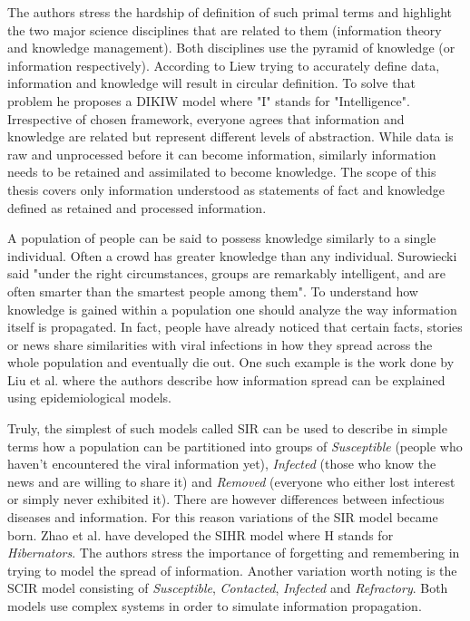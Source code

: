The authors stress the hardship of definition of such primal terms and highlight the two major science disciplines that are related to them (information theory and knowledge management).
Both disciplines use the pyramid of knowledge (or information respectively).
According to Liew\cite{liew2013dikiw} trying to accurately define data, information and knowledge will result in circular definition.
To solve that problem he proposes a DIKIW model where "I" stands for "Intelligence".
Irrespective of chosen framework, everyone agrees that information and knowledge are related but represent different levels of abstraction.
While data is raw and unprocessed before it can become information, similarly information needs to be retained and assimilated to become knowledge.
The scope of this thesis covers only information understood as statements of fact and knowledge defined as retained and processed information.

A population of people can be said to possess knowledge similarly to a single individual.
Often a crowd has greater knowledge than any individual.
Surowiecki said "under the right circumstances, groups are remarkably intelligent, and are often smarter than the smartest people among them"\cite{surowiecki2005wisdom}.
To understand how knowledge is gained within a population one should analyze the way information itself is propagated.
In fact, people have already noticed that certain facts, stories or news share similarities with viral infections in how they spread across the whole population and eventually die out.
One such example is the work done by Liu et al.\cite{liu2016} where the authors describe how information spread can be explained using epidemiological models.

Truly, the simplest of such models called SIR\cite{weiss2013sir} can be used to describe in simple terms how a population can be partitioned into groups of \emph{Susceptible} (people who haven't encountered the viral information yet), \emph{Infected} (those who know the news and are willing to share it) and \emph{Removed} (everyone who either lost interest or simply never exhibited it).
There are however differences between infectious diseases and information.
For this reason variations of the SIR model became born.
Zhao et al.\cite{zhao2012sihr} have developed the SIHR model where H stands for \emph{Hibernators}.
The authors stress the importance of forgetting and remembering in trying to model the spread of information.
Another variation worth noting is the SCIR model consisting of \emph{Susceptible}, \emph{Contacted}, \emph{Infected} and \emph{Refractory}\cite{xiong2012scir}.
Both models use complex systems in order to simulate information propagation.

